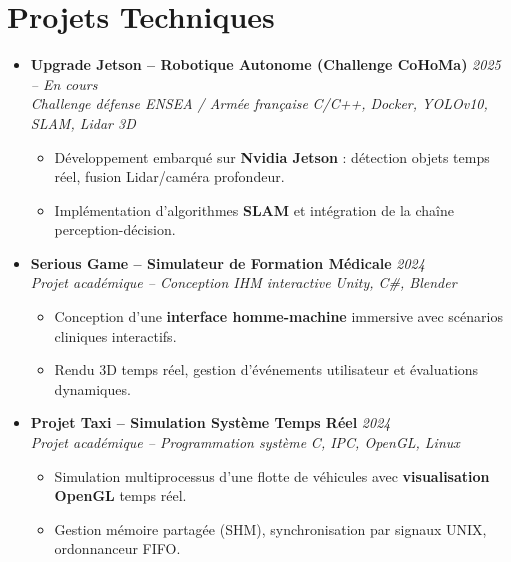 \documentclass[a4paper,11pt]{article}
\begin{document}
\section{Projets Techniques}
\begin{itemize}[leftmargin=*, label={-}]

\item \textbf{Upgrade Jetson -- Robotique Autonome (Challenge CoHoMa)} \hfill \textit{2025 -- En cours} \\
\textit{Challenge défense ENSEA / Armée française} \hfill \textit{C/C++, Docker, YOLOv10, SLAM, Lidar 3D}
\vspace{-2pt}
    \begin{itemize}[leftmargin=0.4cm, nosep, label=\tiny$\bullet$]
        \item \small{Développement embarqué sur \textbf{Nvidia Jetson} : détection objets temps réel, fusion Lidar/caméra profondeur.}
        \item \small{Implémentation d'algorithmes \textbf{SLAM} et intégration de la chaîne perception-décision.}
    \end{itemize}
\vspace{3pt}

\item \textbf{Serious Game -- Simulateur de Formation Médicale} \hfill \textit{2024} \\
\textit{Projet académique -- Conception IHM interactive} \hfill \textit{Unity, C\#, Blender}
\vspace{-2pt}
    \begin{itemize}[leftmargin=0.4cm, nosep, label=\tiny$\bullet$]
        \item \small{Conception d'une \textbf{interface homme-machine} immersive avec scénarios cliniques interactifs.}
        \item \small{Rendu 3D temps réel, gestion d'événements utilisateur et évaluations dynamiques.}
    \end{itemize}
\vspace{3pt}

\item \textbf{Projet Taxi -- Simulation Système Temps Réel} \hfill \textit{2024} \\
\textit{Projet académique -- Programmation système} \hfill \textit{C, IPC, OpenGL, Linux}
\vspace{-2pt}
    \begin{itemize}[leftmargin=0.4cm, nosep, label=\tiny$\bullet$]
        \item \small{Simulation multiprocessus d'une flotte de véhicules avec \textbf{visualisation OpenGL} temps réel.}
        \item \small{Gestion mémoire partagée (SHM), synchronisation par signaux UNIX, ordonnanceur FIFO.}
    \end{itemize}
\vspace{3pt}


\end{itemize}
\end{document}
